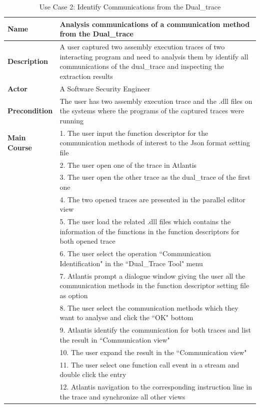 \begin{table}[H]
  \centering
  \caption{Use Case 2: Identify Communications from the Dual\_trace}
  \label{usecase2}
  \begin{tabular}{|l|p{13cm}|}
      \hline
       \textbf{Name} & Analysis communications of a communication method from the Dual\_trace\\
       \hline
       \textbf{Description} & A user captured two assembly execution traces of two interacting program and need to analysis them by identify all communications of the dual\_trace and inspecting the extraction results \\
       \hline
              \textbf{Actor} & A Software Security Engineer \\
       \hline
       \textbf{Precondition} & The user has two assembly execution trace and the .dll files on the systems where the programs of the captured traces were running\\
       \hline
       \textbf{Main Course}& 1. The user input the function descriptor for the communication methods of interest to the Json format setting file\\
        & 2. The user open one of the trace in Atlantis\\
        &  3. The user open the other trace as the dual\_trace of the first one\\
       & 4. The two opened traces are presented in the parallel editor view\\
       & 5. The user load the related .dll files which contains the information of the functions in the function descriptors for both opened trace\\
       & 6. The user select the operation ``Communication Identification" in the ``Dual\_Trace Tool" menu\\
       & 7. Atlantis prompt a dialogue window giving the user all the communication methods in the function descriptor setting file as option\\
       & 8. The user select the communication methods which they want to analyse and click the ``OK" bottom\\
       & 9. Atlantis identify the communication for both traces and list the result in ``Communication view"\\
       & 10. The user expand the result in the ``Communication view"\\
       & 11. The user select one function call event in a stream and double click the entry\\
       & 12. Atlantis navigation to the corresponding instruction line in the trace and synchronize all other views\\
      \hline               
  \end{tabular}
\end{table}

